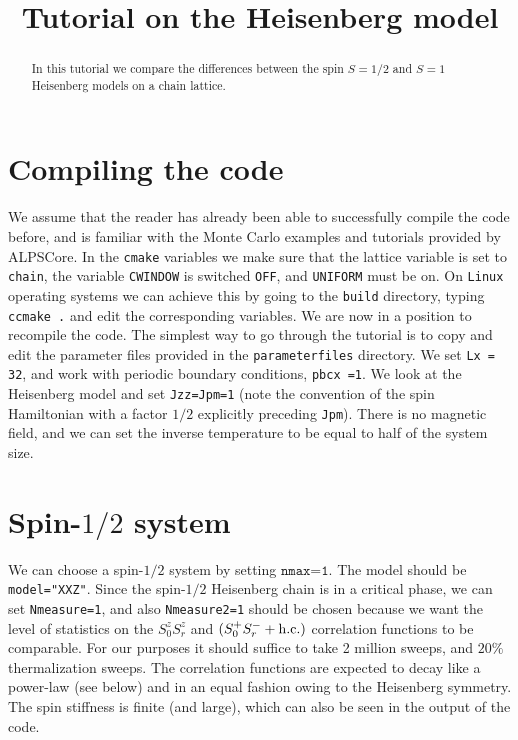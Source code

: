 \documentclass[pra,aps,showpacs,groupedaddress,superscriptaddress,twocolumn,toc=flat]{revtex4-1}
\begin{document}
\title{Tutorial on the Heisenberg model}

\begin{abstract}
In this tutorial we compare the differences between the spin $S=1/2$ and $S=1$ Heisenberg models on a chain lattice.


\end{abstract}

\maketitle

\section{Compiling the code}
We assume that the reader has already been able to successfully compile the code before, and is familiar with the Monte Carlo examples and tutorials provided by ALPSCore.
In the \texttt{cmake} variables  we make sure that the lattice variable is set to \texttt{chain}, the variable \texttt{CWINDOW} is switched \texttt{OFF}, and \texttt{UNIFORM} must be on. 
On \texttt{Linux} operating systems we can achieve this by going to the \texttt{build} directory, typing \texttt{ccmake .} and edit the corresponding variables. We are now in a position to recompile the code.
The simplest way to go through the tutorial is to copy and edit the parameter files provided in the \texttt{parameterfiles} directory. We set  \texttt{Lx = 32}, and work with periodic boundary conditions, \texttt{pbcx =1}.
We look at the Heisenberg model and set \texttt{Jzz=Jpm=1} (note the convention of the spin Hamiltonian with a factor $1/2$ explicitly preceding \texttt{Jpm}). There is no magnetic field, and we can set the inverse temperature to be equal to half of the system size.

\section{Spin-$1/2$ system}
We can choose a spin-$1/2$ system by setting $\texttt{nmax=1}$. The model should be \texttt{model="XXZ"}. Since the spin-$1/2$ Heisenberg chain is in a critical phase, we can set \texttt{Nmeasure=1}, and also \texttt{Nmeasure2=1} should be chosen because we want the level of statistics on the $S^z_0S^z_r$ and $(S^+_0S^-_r + \rm{h.c.})$ correlation functions to be comparable. For our purposes it should suffice to take 2 million sweeps, and $20\%$ thermalization sweeps. The correlation functions are expected to decay like a power-law (see below) and in an equal fashion owing to the Heisenberg symmetry. The spin stiffness is finite (and large), which can also be seen in the output of the code.
\end{document}
